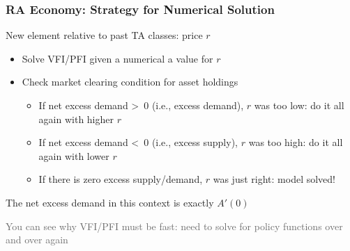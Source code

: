\documentclass[10pt, aspectratio=1610, natbib, handout]{beamer}
\newcommand{\dimmer}[1]{\textcolor{dimgray}{#1}}
\begin{document}
  \begin{frame}
    \frametitle{RA Economy: Strategy for Numerical Solution}

    New element relative to past TA classes: price $r$
    \begin{itemize}
      \item Solve VFI/PFI given a numerical a value for $r$
      \item Check market clearing condition for asset holdings
        \begin{itemize}
          \item If net excess demand \textgreater\ 0 (i.e., excess demand), $r$ was too low: do it all again with higher $r$
          \item If net excess demand \textless\ 0 (i.e., excess supply), $r$ was too high: do it all again with lower $r$
          \item If there is zero excess supply/demand, $r$ was just right: model solved!
        \end{itemize}
    \end{itemize}

    \vfill\pause

    The net excess demand in this context is exactly $A'(0)$

    \vfill\pause

    \dimmer{You can see why VFI/PFI must be fast: need to solve for policy functions over and over again}

  \end{frame}
\end{document}
